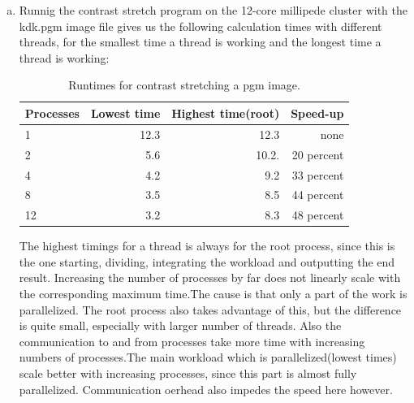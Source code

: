 \documentclass[a4paper]{article}
\begin{document}
\begin{enumerate} [(a)]
	\item Runnig the contrast stretch program on the 12-core millipede cluster with the kdk.pgm image file gives us the following calculation times with different threads, for the smallest time a thread is working and the longest time a thread is working:

\begin{table}[h]
	\centering
	\caption{Runtimes for contrast stretching a pgm image.}
	\label{tbl:contrast}
	\begin{tabular}{l|r|r|r}
		Processes & Lowest time & Highest time(root) & Speed-up \\ \hline
		 1 & 12.3 & 12.3 & none       \\
		 2 & 5.6 & 10.2. & 20 percent \\
		 4 & 4.2 & 9.2   & 33 percent \\
		 8 &  3.5 & 8.5  & 44 percent \\
		12 &  3.2 & 8.3 &  48 percent\\
	\end{tabular}
\end{table}
The highest timings for a thread is always for the root process, since this is the one starting, dividing, integrating the workload and outputting the end result. Increasing the number of processes by far does not linearly scale with the corresponding maximum time.The cause is that only a part of the work is parallelized. The root process also takes advantage of this, but the difference is quite small, especially with larger number of threads. Also the communication to and from processes take more time with increasing numbers of processes.The main workload which is parallelized(lowest times) scale better with increasing processes, since this part is almost fully parallelized. Communication oerhead also impedes the speed here however. 

\end{enumerate}
\end{document}
